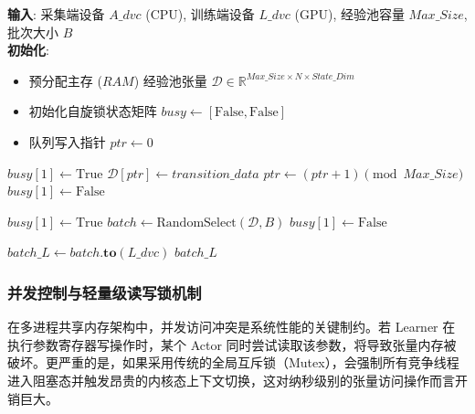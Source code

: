 \documentclass[
  oneside,
  degree=bachelor,
  fullwidthstop=false,
  fontset=fandol,
  times=false,
  minted=true,
  biblatex=true,
]{tongjithesis}
\begin{document}
\begin{algorithm}
\caption{共享数据中枢的异构张量流转与自旋锁控制伪代码}
\label{alg:shared_data}
\textbf{输入}: 采集端设备 $A\_dvc$ (CPU), 训练端设备 $L\_dvc$ (GPU), 经验池容量 $Max\_Size$, 批次大小 $B$\\
\textbf{初始化}: 
\begin{itemize}
    \vspace{-0.2cm}
    \item 预分配主存 ($RAM$) 经验池张量 $\mathcal{D} \in \mathbb{R}^{Max\_Size \times N \times State\_Dim}$
    \item 初始化自旋锁状态矩阵 $busy \leftarrow [\text{False}, \text{False}]$
    \item 队列写入指针 $ptr \leftarrow 0$
\end{itemize}
\vspace{-0.2cm}
\begin{algorithmic}[1]
 
     
        \State {} 
    \EndWhile
    \State $busy[1] \leftarrow \text{True}$ 
    \State $\mathcal{D}[ptr] \leftarrow transition\_data$ 
    \State $ptr \leftarrow (ptr + 1) \pmod{Max\_Size}$ 
    \State $busy[1] \leftarrow \text{False}$ 
\EndFunction

\State
{} 
        \State {} 
    \EndWhile
    \State $busy[1] \leftarrow \text{True}$
    \State $batch \leftarrow \text{RandomSelect}(\mathcal{D}, B)$ 
    \State $busy[1] \leftarrow \text{False}$
    
    \State $batch\_L \leftarrow batch\mathbf{.to}(L\_dvc)$ 
    \State \Return $batch\_L$ 
\EndFunction
\end{algorithmic}
\end{algorithm}

\subsubsection{并发控制与轻量级读写锁机制}

在多进程共享内存架构中，并发访问冲突是系统性能的关键制约。若 Learner 在执行参数寄存器写操作时，某个 Actor 同时尝试读取该参数，将导致张量内存被破坏。更严重的是，如果采用传统的全局互斥锁（Mutex），会强制所有竞争线程进入阻塞态并触发昂贵的内核态上下文切换，这对纳秒级别的张量访问操作而言开销巨大。
\end{document}
